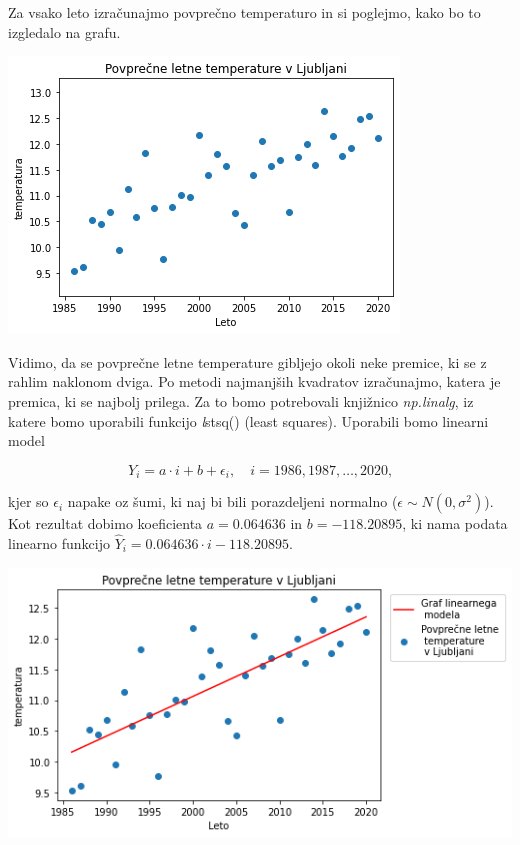 \documentclass[12pt, a4paper]{article}
\begin{document}
Za vsako leto izračunajmo povprečno temperaturo in si poglejmo, kako bo to 
izgledalo na grafu.

\begin{center}
    \includegraphics[scale=0.5]{Naloga_3_02}
\end{center}

Vidimo, da se povprečne letne temperature gibljejo okoli neke premice, ki se 
z rahlim naklonom dviga. Po metodi najmanjših kvadratov izračunajmo, katera je 
premica, ki se najbolj prilega. Za to bomo potrebovali knjižnico \emph{np.linalg},
iz katere bomo uporabili funkcijo \emph lstsq() (least squares). Uporabili 
bomo linearni model

$$ Y_i = a \cdot i + b + \epsilon_i, \quad i = 1986, 1987, \dots, 2020 \text{,}
$$

kjer so $\epsilon_i$ napake oz šumi, ki naj bi bili porazdeljeni normalno 
($\epsilon \sim N(0, \sigma^2)$). Kot rezultat dobimo koeficienta 
$a = 0.064636$ in $b = -118.20895$, ki nama podata linearno funkcijo 
$\hat{Y}_i = 0.064636 \cdot i - 118.20895$. 

\begin{center}
    \includegraphics[scale=0.5]{Naloga_3_03}
\end{center}
\end{document}
